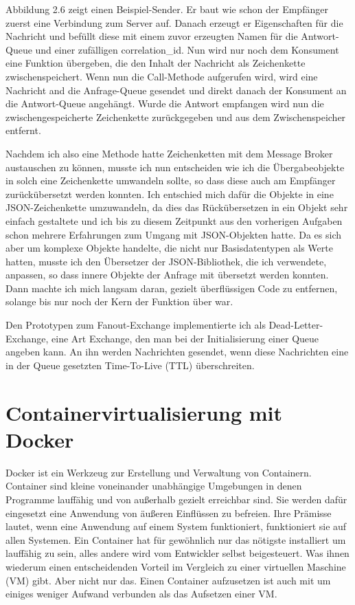 \documentclass[12pt,a4paper]{scrartcl}
\begin{document}
Abbildung 2.6 zeigt einen Beispiel-Sender. Er baut wie schon der Empfänger zuerst eine Verbindung zum Server auf. Danach erzeugt er Eigenschaften für die Nachricht und befüllt diese mit einem zuvor erzeugten Namen für die Antwort-Queue und einer zufälligen correlation\_id. Nun wird nur noch dem Konsument eine Funktion übergeben, die den Inhalt der Nachricht als Zeichenkette zwischenspeichert. Wenn nun die Call-Methode aufgerufen wird, wird eine Nachricht and die Anfrage-Queue gesendet und direkt danach der Konsument an die Antwort-Queue angehängt. Wurde die Antwort empfangen wird nun die zwischengespeicherte Zeichenkette zurückgegeben und aus dem Zwischenspeicher entfernt.

Nachdem ich also eine Methode hatte Zeichenketten mit dem Message Broker austauschen zu können, musste ich nun entscheiden wie ich die Übergabeobjekte in solch eine Zeichenkette umwandeln sollte, so dass diese auch am Empfänger zurückübersetzt werden konnten.
Ich entschied mich dafür die Objekte in eine JSON-Zeichenkette umzuwandeln, da dies das Rückübersetzen in ein Objekt sehr einfach gestaltete und ich bis zu diesem Zeitpunkt aus den vorherigen Aufgaben schon mehrere Erfahrungen zum Umgang mit JSON-Objekten hatte. 
Da es sich aber um komplexe Objekte handelte, die nicht nur Basisdatentypen als Werte hatten, musste ich den Übersetzer der JSON-Bibliothek, die ich verwendete, anpassen, so dass innere Objekte der Anfrage mit übersetzt werden konnten. 
Dann machte ich mich langsam daran, gezielt überflüssigen Code zu entfernen, solange bis nur noch der Kern der Funktion über war.

Den Prototypen zum Fanout-Exchange implementierte ich als Dead-Letter-Exchange, eine Art Exchange, den man bei der Initialisierung einer Queue angeben kann. An ihn werden Nachrichten gesendet, wenn diese Nachrichten eine in der Queue gesetzten Time-To-Live (TTL) überschreiten.



\section{Containervirtualisierung mit Docker} \label{docker}
Docker ist ein Werkzeug zur Erstellung und Verwaltung von Containern. 
Container sind kleine voneinander unabhängige Umgebungen in denen Programme lauffähig und von außerhalb gezielt erreichbar sind. Sie werden dafür eingesetzt eine Anwendung von äußeren Einflüssen zu befreien. Ihre Prämisse lautet, wenn eine Anwendung auf einem System funktioniert, funktioniert sie auf allen Systemen. Ein Container hat für gewöhnlich nur das nötigste installiert um lauffähig zu sein, alles andere wird vom Entwickler selbst beigesteuert. Was ihnen wiederum einen entscheidenden Vorteil im Vergleich zu einer virtuellen Maschine (VM) gibt. Aber nicht nur das. Einen Container aufzusetzen ist auch mit um einiges weniger Aufwand verbunden als das Aufsetzen einer VM. 
\end{document}

